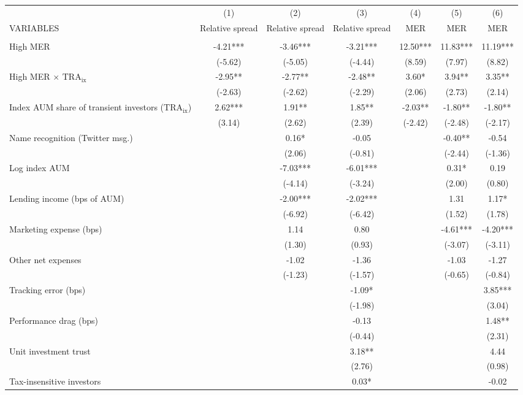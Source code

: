 \documentclass[]{article}
\begin{document}
\begin{tabular}{lcccccc} \hline
 & (1) & (2) & (3) & (4) & (5) & (6) \\
VARIABLES & Relative spread & Relative spread & Relative spread & MER & MER & MER \\ \hline
 &  &  &  &  &  &  \\
High MER & -4.21*** & -3.46*** & -3.21*** & 12.50*** & 11.83*** & 11.19*** \\
 & (-5.62) & (-5.05) & (-4.44) & (8.59) & (7.97) & (8.82) \\
High MER $\times$ $\text{TRA}_\text{ix}$ & -2.95** & -2.77** & -2.48** & 3.60* & 3.94** & 3.35** \\
 & (-2.63) & (-2.62) & (-2.29) & (2.06) & (2.73) & (2.14) \\
Index AUM share of transient investors ($\text{TRA}_\text{ix}$) & 2.62*** & 1.91** & 1.85** & -2.03** & -1.80** & -1.80** \\
 & (3.14) & (2.62) & (2.39) & (-2.42) & (-2.48) & (-2.17) \\
Name recognition (Twitter msg.) &  & 0.16* & -0.05 &  & -0.40** & -0.54 \\
 &  & (2.06) & (-0.81) &  & (-2.44) & (-1.36) \\
Log index AUM &  & -7.03*** & -6.01*** &  & 0.31* & 0.19 \\
 &  & (-4.14) & (-3.24) &  & (2.00) & (0.80) \\
Lending income (bps of AUM) &  & -2.00*** & -2.02*** &  & 1.31 & 1.17* \\
 &  & (-6.92) & (-6.42) &  & (1.52) & (1.78) \\
Marketing expense (bps) &  & 1.14 & 0.80 &  & -4.61*** & -4.20*** \\
 &  & (1.30) & (0.93) &  & (-3.07) & (-3.11) \\
Other net expenses &  & -1.02 & -1.36 &  & -1.03 & -1.27 \\
 &  & (-1.23) & (-1.57) &  & (-0.65) & (-0.84) \\
Tracking error (bps) &  &  & -1.09* &  &  & 3.85*** \\
 &  &  & (-1.98) &  &  & (3.04) \\
Performance drag (bps) &  &  & -0.13 &  &  & 1.48** \\
 &  &  & (-0.44) &  &  & (2.31) \\
Unit investment trust &  &  & 3.18** &  &  & 4.44 \\
 &  &  & (2.76) &  &  & (0.98) \\
Tax-insensitive investors &  &  & 0.03* &  &  & -0.02 \\

\end{tabular}
\end{document}
